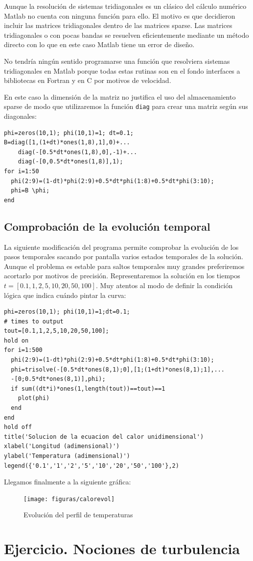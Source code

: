 Aunque la resolución de sistemas tridiagonales es un clásico del
cálculo numérico Matlab no cuenta con ninguna función para ello. El
motivo es que decidieron incluir las matrices tridiagonales dentro de
las matrices sparse. Las matrices tridiagonales o con pocas bandas se
resuelven eficientemente mediante un método directo con lo que en este
caso Matlab tiene un error de diseño.

No tendría ningún sentido programarse una función que resolviera
sistemas tridiagonales en Matlab porque todas estas rutinas son en el
fondo interfaces a bibliotecas en Fortran y en C por motivos de
velocidad.

En este caso la dimensión de la matriz no justifica el uso del
almacenamiento sparse de modo que utilizaremos la función
\texttt{diag} para crear una matriz según sus diagonales:

\begin{verbatim}
phi=zeros(10,1); phi(10,1)=1; dt=0.1;
B=diag([1,(1+dt)*ones(1,8),1],0)+...
    diag(-[0.5*dt*ones(1,8),0],-1)+...
    diag(-[0,0.5*dt*ones(1,8)],1);
for i=1:50
  phi(2:9)=(1-dt)*phi(2:9)+0.5*dt*phi(1:8)+0.5*dt*phi(3:10);
  phi=B \phi;
end
\end{verbatim}

\subsection{Comprobación de la evolución temporal}

La siguiente modificación del programa permite comprobar la evolución
de los pasos temporales sacando por pantalla varios estados temporales
de la solución. Aunque el problema es estable para saltos temporales
muy grandes preferiremos acortarlo por motivos de precisión.
Representaremos la solución en los tiempos
$t=[0.1,1,2,5,10,20,50,100]$. Muy atentos al modo de definir la
condición lógica que indica cuándo pintar la curva:

\begin{verbatim}
phi=zeros(10,1); phi(10,1)=1;dt=0.1;
# times to output
tout=[0.1,1,2,5,10,20,50,100];
hold on
for i=1:500 
  phi(2:9)=(1-dt)*phi(2:9)+0.5*dt*phi(1:8)+0.5*dt*phi(3:10);
  phi=trisolve(-[0.5*dt*ones(8,1);0],[1;(1+dt)*ones(8,1);1],...
  -[0;0.5*dt*ones(8,1)],phi);
  if sum((dt*i)*ones(1,length(tout))==tout)==1
    plot(phi)
  end
end
hold off
title('Solucion de la ecuacion del calor unidimensional')
xlabel('Longitud (adimensional)')
ylabel('Temperatura (adimensional)')
legend({'0.1','1','2','5','10','20','50','100'},2)
\end{verbatim}
Llegamos finalmente a la siguiente gráfica:

%
\begin{figure}[H]
  \centering{} \texttt{[image: figuras/calorevol]}


  \caption{Evolución del perfil de temperaturas}
\end{figure}



\section{Ejercicio.  Nociones de turbulencia}

